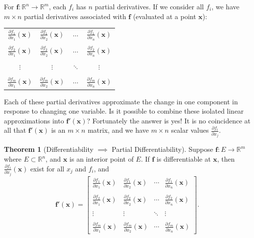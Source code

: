\documentclass{article}
\newcommand{\R}{\mathbb{R}}
\newcommand{\x}{\mathbf{x}}
\newcommand{\f}{\mathbf{f}}
\theoremstyle{definition}
\newtheorem{theorem}{Theorem}[section]
\begin{document}
For $ \f:\R^n\to\R^m $, each $ f_i $ has $ n $ partial derivatives. If we consider all $ f_i $, we have $ m\times n $ partial derivatives associated with $ \f $ (evaluated at a point $ \x $): 
\begin{center}
	\begin{tabular}{ c c c c}
		$ \frac{\partial f_1}{\partial x_1}(\x)$& $ \frac{\partial f_1}{\partial x_2}(\x)$ & $\cdots $  & $ \frac{\partial f_1}{\partial x_n}(\x)$\\ \\
		$ \frac{\partial f_2}{\partial x_1}(\x)$& $ \frac{\partial f_2}{\partial x_2}(\x)$ & $\cdots $  & $ \frac{\partial f_2}{\partial x_n}(\x)$ \\  \\
		$\vdots$ & $\vdots$ & $\ddots$    & $\vdots$ \\ \\ 
		$ \frac{\partial f_m}{\partial x_1}(\x)$& $ \frac{\partial f_m}{\partial x_2}(\x)$ & $\cdots $  & $ \frac{\partial f_m}{\partial x_n}(\x)$ 
	\end{tabular}
\end{center}
Each of these partial derivatives approximate the change in one component in response to changing one variable. Is it possible to combine these isolated linear approximations into $ \f'(\x) $? Fortunately the answer is yes! It is no coincidence at all that $ \f'(\x) $ is an $ m\times n $ matrix, and we have $ m\times n $ scalar values $ \frac{\partial f_i}{\partial x_j} $. 
\begin{theorem}[Differentiability $ \implies $ Partial Differentiability]
		Suppose $ \f:E\to\R^m $ where $ E\subset \R^n $, and $ \mathbf x $ is an interior point of $ E $. If $ \f $ is differentiable at $ \x $, then $ \frac{\partial f_i}{\partial x_j}(\x) $ exist for all $ x_j $ and $ f_i $, and 
	$$\f'(\x) = \begin{bmatrix}
		\frac{\partial f_1}{\partial x_1}(\x) &   \frac{\partial f_1}{\partial x_2}(\x)  &  \cdots    &   \frac{\partial f_1}{\partial x_n}(\x) \\ \\
		\frac{\partial f_2}{\partial x_1}(\x) &   \frac{\partial f_2}{\partial x_2}(\x)  &  \cdots    &   \frac{\partial f_2}{\partial x_n}(\x)  \\  \\
		\vdots  &  \vdots  &  \ddots     &  \vdots  \\ \\ 
		\frac{\partial f_m}{\partial x_1}(\x) &   \frac{\partial f_m}{\partial x_2}(\x)  &  \cdots    &   \frac{\partial f_m}{\partial x_n}(\x)  
	\end{bmatrix} .$$
\end{theorem}
\end{document}
